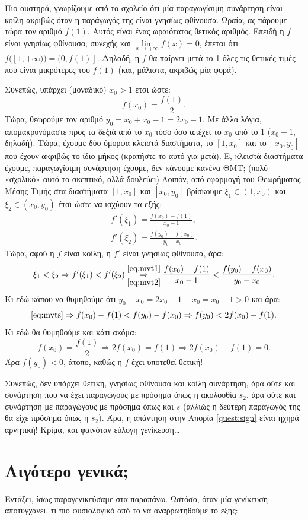 \documentclass[11pt,a4paper]{article}
\theoremstyle{definition}
\begin{document}
	Πιο αυστηρά, γνωρίζουμε από το σχολείο ότι μία παραγωγίσιμη συνάρτηση είναι κοίλη ακριβώς όταν η παράγωγός της είναι γνησίως φθίνουσα. Ωραία, ας πάρουμε τώρα τον αριθμό $f(1)$. Αυτός είναι ένας ωραιότατος θετικός αριθμός. Επειδή η $f$ είναι γνησίως φθίνουσα, συνεχής και $\lim\limits_{x\to+\infty}f(x)=0$, έπεται ότι $f([1,+\infty))=(0,f(1)]$. Δηλαδή, η $f$ θα παίρνει μετά το 1 όλες τις θετικές τιμές που είναι μικρότερες του $f(1)$ (και, μάλιστα, ακριβώς μία φορά).
	
	Συνεπώς, υπάρχει (μοναδικό) $x_0>1$ έτσι ώστε:
	\[f(x_0)=\frac{f(1)}{2}.\]
	Τώρα, θεωρούμε τον αριθμό $y_0=x_0+x_0-1=2x_0-1$. Με άλλα λόγια, απομακρυνόμαστε προς τα δεξιά από το $x_0$ τόσο όσο απέχει το $x_0$ από το 1 ($x_0-1$, δηλαδή). Τώρα, έχουμε δύο όμορφα κλειστά διαστήματα, το $[1,x_0]$ και το $[x_0,y_0]$ που έχουν ακριβώς το ίδιο μήκος (κρατήστε το αυτό για μετά). Ε, κλειστά διαστήματα έχουμε, παραγωγίσιμη συνάρτηση έχουμε, δεν κάνουμε κανένα ΘΜΤ; (πολύ «σχολικό» αυτό το σκεπτικό, αλλά δουλεύει) Λοιπόν, από εφαρμογή του Θεωρήματος Μέσης Τιμής στα διαστήματα $[1,x_0]$ και $[x_0,y_0]$ βρίσκουμε $\xi_1\in(1,x_0)$ και $\xi_2\in(x_0,y_0)$ έτσι ώστε να ισχύουν τα εξής:
	\begin{align}
	f'(\xi_1)=\frac{f(x_0)-f(1)}{x_0-1},\label{eq:mvt1}\\
	f'(\xi_2)=\frac{f(y_0)-f(x_0)}{y_0-x_0}.\label{eq:mvt2}
	\end{align}
	Τώρα, αφού η $f$ είναι κοίλη, η $f'$ είναι γνησίως φθίνουσα, άρα:
	\begin{equation}\label{eq:mvts}
	\xi_1<\xi_2\Rightarrow f'(\xi_1)<f'(\xi_2)\overset{\eqref{eq:mvt1}}{\underset{\eqref{eq:mvt2}}{\Rightarrow}}\frac{f(x_0)-f(1)}{x_0-1}<\frac{f(y_0)-f(x_0)}{y_0-x_0}.
	\end{equation}
	Κι εδώ κάπου να θυμηθούμε ότι $y_0-x_0=2x_0-1-x_0=x_0-1>0$ και άρα:
	\[\eqref{eq:mvts}\Rightarrow f(x_0)-f(1)<f(y_0)-f(x_0)\Rightarrow f(y_0)<2f(x_0)-f(1).\]
	Κι εδώ θα θυμηθούμε και κάτι ακόμα:
	\[f(x_0)=\frac{f(1)}{2}\Rightarrow2f(x_0)=f(1)\Rightarrow2f(x_0)-f(1)=0.\]
	Άρα $f(y_0)<0$, άτοπο, καθώς η $f$ έχει υποτεθεί θετική!
	
	Συνεπώς, δεν υπάρχει θετική, γνησίως φθίνουσα και κοίλη συνάρτηση, άρα ούτε και συνάρτηση που να έχει παραγώγους με πρόσημα όπως η ακολουθία $s_2$, άρα ούτε και συνάρτηση με παραγώγους με πρόσημα όπως και $s$ (αλλιώς η δεύτερη παράγωγός της θα είχε πρόσημα όπως η $s_2$). Άρα, η απάντηση στην Απορία \ref{quest:sign} είναι ηχηρά αρνητική! Κρίμα, και φαινόταν εύλογη γενίκευση\ldots
	
	\section{Λιγότερο γενικά;}
	Εντάξει, ίσως παραγενικεύσαμε στα παραπάνω. Ωστόσο, όταν μία γενίκευση αποτυγχάνει, τι πιο φυσιολογικό από το να αναρρωτηθούμε το εξής:
\end{document}
